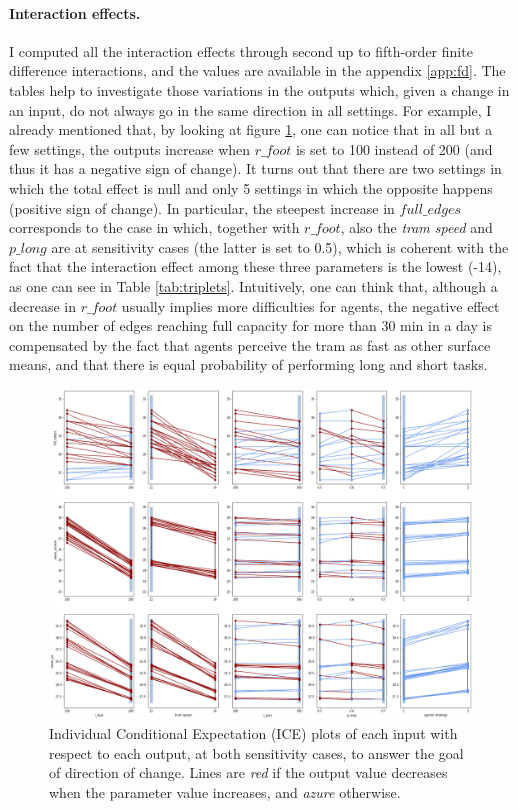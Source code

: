 \paragraph{Interaction effects.} 
I computed all the interaction effects through second up to fifth-order finite difference interactions, and the values are available in the appendix \ref{app:fd}. The tables help to investigate those variations in the outputs which, given a change in an input, do not always go in the same direction in all settings. For example, I already mentioned that, by looking at figure \ref{fig:ICE}, one can notice that in all but a few settings, the outputs increase when $r\_foot$ is set to 100 instead of 200 (and thus it has a negative sign of change). It turns out that there are two settings in which the total effect is null and only 5 settings in which the opposite happens (positive sign of change). In particular, the steepest increase in $full\_edges$ corresponds to the case in which, together with $r\_foot$, also the \textit{tram speed} and $p\_long$ are at sensitivity cases (the latter is set to 0.5), which is coherent with the fact that the interaction effect among these three parameters is the lowest (-14), as one can see in Table \ref{tab:triplets}. Intuitively, one can think that, although a decrease in $r\_foot$ usually implies more difficulties for agents, the negative effect on the number of edges reaching full capacity for more than 30 min in a day is compensated by the fact that agents perceive the tram as fast as other surface means, and that there is equal probability of performing long and short tasks.

\begin{landscape}
\begin{figure}
    \centering
    \includegraphics[height = \textheight]{tex/pics/ICE.png}
    \caption{Individual Conditional Expectation (ICE) plots of each input with respect to each output, at both sensitivity cases, to answer the goal of direction of change. Lines are \textit{red} if the output value decreases when the parameter value increases, and \textit{azure} otherwise.}
    \label{fig:ICE}
\end{figure}
\end{landscape}